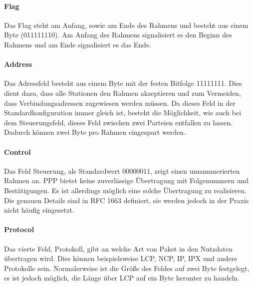 \documentclass[12pt, a4paper, ngerman]{article}
\begin{document}
\paragraph{Flag}

Das Flag steht am Anfang, sowie am Ende des Rahmens und besteht aus einem Byte (011111110). Am Anfang des Rahmens signalisiert es den Beginn des Rahmens und am Ende signalisiert es das Ende.


\paragraph{Address}

Das Adressfeld besteht aus einem Byte mit der festen Bitfolge 11111111. Dies dient dazu, dass alle Stationen den Rahmen akzeptieren und zum Vermeiden, dass Verbindungsadressen zugewiesen werden müssen. Da dieses Feld in der Standardkonfiguration immer gleich ist, besteht die Möglichkeit, wie auch bei dem Steuerungsfeld, dieses Feld zwischen zwei Parteien entfallen zu lassen. Dadurch können zwei Byte pro Rahmen eingespart werden.


\paragraph{Control}

Das Feld Steuerung, als Standardwert 00000011, zeigt einen unnummerierten Rahmen an. PPP bietet keine zuverlässige Übertragung mit Folgenummern und Bestätigungen. Es ist allerdings möglich eine solche 
Über\-tra\-gung zu realisieren. Die genauen Details sind in RFC 1663 definiert, sie werden jedoch in der Praxis nicht häufig eingesetzt.


\paragraph{Protocol}

Das vierte Feld, Protokoll, gibt an welche Art von Paket in den Nutzdaten übertragen wird. Dies können beispielsweise LCP, NCP, IP, IPX und andere Protokolle sein. Normalerweise ist die Größe des Feldes auf zwei Byte festgelegt, es ist jedoch möglich, die Länge über LCP auf ein Byte herunter zu handeln.
\end{document}
